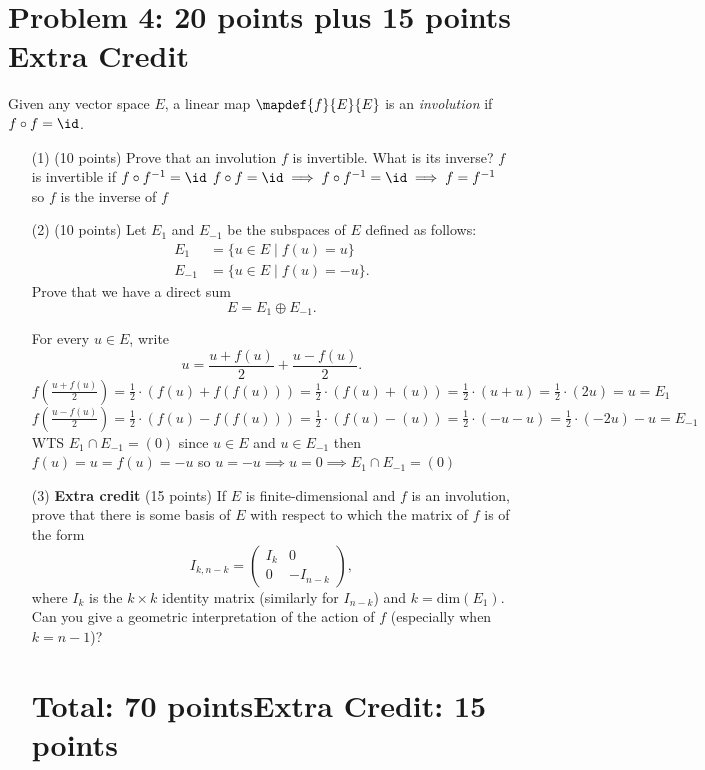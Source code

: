 \documentclass[12pt]{article}
\begin{document}
\section*{Problem 4: 20 points plus 15 points Extra Credit}
\label{prob-5.5}
Given any vector space $E$, a linear map  $\mapdef{f}{E}{E}$  is an
{\it involution\/} if  $f\circ f = \id$.

\begin{itemize}
\item[(1)](10 points)
Prove that an  involution $f$ is invertible. What is its inverse?
\newline $f$ is invertible if $f\circ f^{-1}= \id $
\newline $f\circ f = \id \implies f\circ f^{-1} = \id \implies f=f^{-1}$
\newline so $f$ is the inverse of $f$
\item[(2)](10 points)
Let $E_1$ and $E_{-1}$ be the subspaces of $E$ defined as follows:
\begin{align*}
E_1 & = \{u \in E \mid f(u) = u\} \\
E_{-1} & = \{u \in E \mid f(u) = -u\}.
\end{align*}
Prove that we have a direct sum
\[
E = E_{1} \oplus E_{-1}.
\]

\hint
For every $u\in E$, write
\[
u = \frac{u + f(u)}{2} + \frac{u - f(u)}{2}. 
\]
$f(\frac{u + f(u)}{2})=\frac{1}{2}\cdot (f(u)+f(f(u)))=\frac{1}{2}\cdot (f(u)+(u))=\frac{1}{2}\cdot (u+u)=\frac{1}{2}\cdot (2u)=u=E_1$
\newline $f(\frac{u - f(u)}{2})=\frac{1}{2}\cdot (f(u)-f(f(u)))=\frac{1}{2}\cdot (f(u)-(u))=\frac{1}{2}\cdot (-u-u)=\frac{1}{2}\cdot (-2u)-u=E_{-1}$
\newline
\newline WTS $E_1 \cap E_{-1}=(0)$
\newline
\newline since $u \in E$ and $u \in E_{-1}$
\newline then $f(u)=u=f(u)=-u$
\newline so $u=-u \implies u=0 \implies E_1 \cap E_{-1}=(0)$


\item[(3)]{ \bf Extra credit }(15 points)
If $E$ is finite-dimensional and $f$ is an involution, prove that
there is some basis of $E$ with respect to which the matrix of $f$ is of the form
\[
I_{k , n - k} =
\begin{pmatrix}
I_k & 0 \\
0 & - I_{n - k}
\end{pmatrix},
\]
where $I_k$ is the $k\times k$ identity matrix 
(similarly for $I_{n -  k}$) and $k = \mathrm{dim}(E_1)$.
Can you give a geometric interpretation of the action of $f$
(especially when   $k = n - 1$)?

\section*{Total: 70 points\qquad Extra Credit: 15 points}
\end{itemize}
\end{document}
